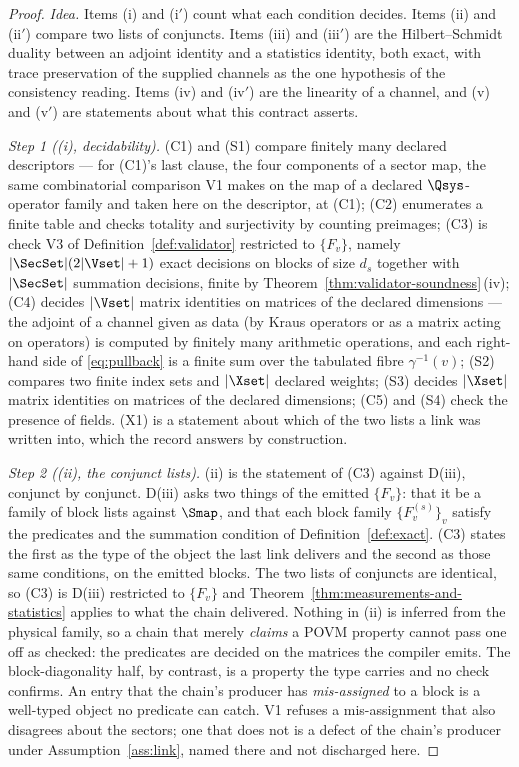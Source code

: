 \begin{proof}
\emph{Idea.} Items (i) and (i$'$) count what each condition decides. Items
(ii) and (ii$'$) compare two lists of conjuncts. Items (iii) and (iii$'$) are
the Hilbert--Schmidt duality between an adjoint identity and a statistics
identity, both exact, with trace preservation of the supplied channels as the
one hypothesis of the consistency reading. Items (iv) and (iv$'$) are the
linearity of a channel, and (v) and (v$'$) are statements about what this
contract asserts.

\emph{Step 1 ((i), decidability).} (C1) and (S1) compare finitely many
declared descriptors --- for (C1)'s last clause, the four components of a
sector map, the same combinatorial comparison V1 makes on the map of a
declared $\Qsys$-operator family and taken here on the descriptor, at (C1);
(C2) enumerates a finite table and checks totality and surjectivity by
counting preimages; (C3) is check V3 of Definition~\ref{def:validator}
restricted to $\{F_v\}$, namely $|\SecSet|(2|\Vset|+1)$ exact decisions on
blocks of size $d_s$ together with $|\SecSet|$ summation decisions, finite by
Theorem~\ref{thm:validator-soundness}\,(iv); (C4) decides $|\Vset|$ matrix identities on
matrices of the declared dimensions --- the adjoint of a channel given as data
(by Kraus operators or as a matrix acting on operators) is computed by finitely
many arithmetic operations, and each right-hand side of \eqref{eq:pullback} is
a finite sum over the tabulated fibre $\gamma^{-1}(v)$; (S2) compares two finite
index sets and $|\Xset|$ declared weights; (S3) decides $|\Xset|$ matrix
identities on matrices of the declared dimensions; (C5) and (S4) check the
presence of fields. (X1) is a statement about which of the two lists a link was
written into, which the record answers by construction.

\emph{Step 2 ((ii), the conjunct lists).} (ii) is the statement of (C3)
against D(iii), conjunct by conjunct. D(iii) asks two things of the emitted
$\{F_v\}$: that it be a family of block lists against $\Smap$, and that each
block family $\{F_v^{(s)}\}_v$ satisfy the predicates and the summation
condition of Definition~\ref{def:exact}. (C3) states the first as the type of
the object the last link delivers and the second as those same conditions, on
the emitted blocks. The two lists of conjuncts are identical, so (C3) is
D(iii) restricted to $\{F_v\}$ and Theorem~\ref{thm:measurements-and-statistics} applies to what the
chain delivered. Nothing in (ii) is inferred from the physical family, so a
chain that merely \emph{claims} a POVM property cannot pass one off as
checked: the predicates are decided on the matrices the compiler emits. The
block-diagonality half, by contrast, is a property the type carries and no
check confirms. An entry that the chain's producer has \emph{mis-assigned} to
a block is a well-typed object no predicate can catch. V1 refuses a
mis-assignment that also disagrees about the sectors; one that does not is a
defect of the chain's producer under Assumption~\ref{ass:link}, named there
and not discharged here.


\end{proof}
